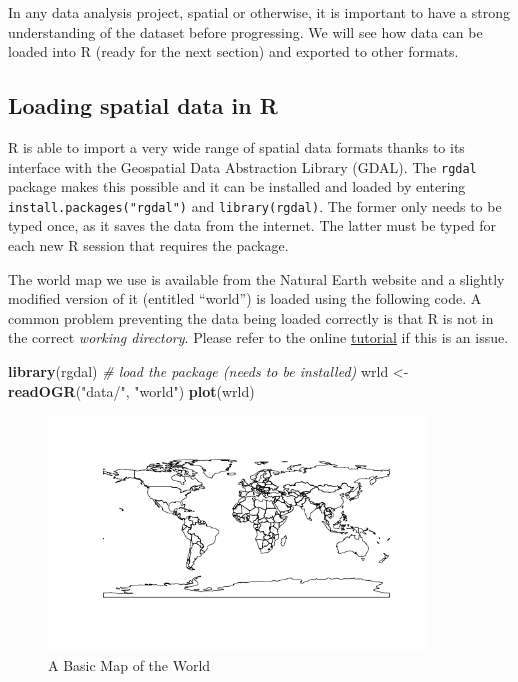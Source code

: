 \documentclass[]{article}
\newenvironment{Shaded}{}{}
\newcommand{\KeywordTok}[1]{\textcolor[rgb]{0.00,0.44,0.13}{\textbf{{#1}}}}
\newcommand{\StringTok}[1]{\textcolor[rgb]{0.25,0.44,0.63}{{#1}}}
\newcommand{\CommentTok}[1]{\textcolor[rgb]{0.38,0.63,0.69}{\textit{{#1}}}}
\newcommand{\NormalTok}[1]{{#1}}
\let\Oldincludegraphics\includegraphics
\renewcommand{\includegraphics}[1]{\Oldincludegraphics[width=10cm]{#1}}
\begin{document}
In any data analysis project, spatial or otherwise, it is important to
have a strong understanding of the dataset before progressing. We will
see how data can be loaded into R (ready for the next section) and
exported to other formats.

\subsection{Loading spatial data in R}

R is able to import a very wide range of spatial data formats thanks to
its interface with the Geospatial Data Abstraction Library (GDAL). The
\texttt{rgdal} package makes this possible and it can be installed and
loaded by entering \texttt{install.packages("rgdal")} and
\texttt{library(rgdal)}. The former only needs to be typed once, as it
saves the data from the internet. The latter must be typed for each new
R session that requires the package.

The world map we use is available from the Natural Earth website and a
slightly modified version of it (entitled ``world'') is loaded using the
following code. A common problem preventing the data being loaded
correctly is that R is not in the correct \emph{working directory}.
Please refer to the online
\href{https://github.com/geocomPP/sdvwR/blob/master/sdv-tutorial.pdf?raw=true}{tutorial}
if this is an issue.

\begin{Shaded}
\begin{Highlighting}[]
\KeywordTok{library}\NormalTok{(rgdal)  }\CommentTok{# load the package (needs to be installed)}
\NormalTok{wrld <- }\KeywordTok{readOGR}\NormalTok{(}\StringTok{"data/"}\NormalTok{, }\StringTok{"world"}\NormalTok{)}
\KeywordTok{plot}\NormalTok{(wrld)}
\end{Highlighting}
\end{Shaded}

\begin{figure}[htbp]
\centering
\includegraphics{figure/A_Basic_Map_of_the_World.png}
\caption{A Basic Map of the World}
\end{figure}
\end{document}
